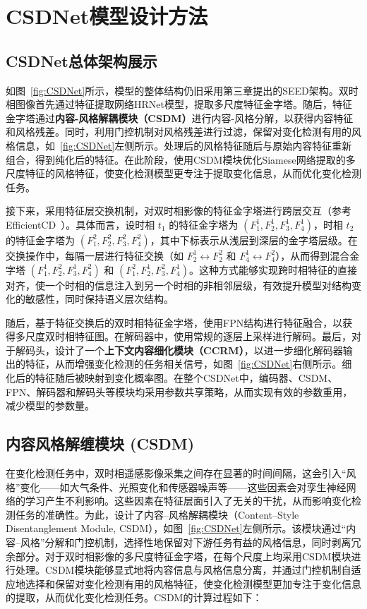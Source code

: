 \section{CSDNet模型设计方法}
\subsection{CSDNet总体架构展示}
如图~\ref{fig:CSDNet}所示，模型的整体结构仍旧采用第三章提出的SEED架构。双时相图像首先通过特征提取网络HRNet模型，提取多尺度特征金字塔。随后，特征金字塔通过\textbf{内容-风格解耦模块（CSDM）}进行内容-风格分解，以获得内容特征和风格残差。同时，利用门控机制对风格残差进行过滤，保留对变化检测有用的风格信息，如~\ref{fig:CSDNet}左侧所示。处理后的风格特征随后与原始内容特征重新组合，得到纯化后的特征。在此阶段，使用CSDM模块优化Siamese网络提取的多尺度特征的风格特征，使变化检测模型更专注于提取变化信息，从而优化变化检测任务。

接下来，采用特征层交换机制，对双时相影像的特征金字塔进行跨层交互（参考 EfficientCD~\cite{dong_efficientcd_2024}）。具体而言，设时相 $t_1$ 的特征金字塔为 $(F^1_1, F^1_2, F^1_3, F^1_4)$，时相 $t_2$ 的特征金字塔为 $(F^2_1, F^2_2, F^2_3, F^2_4)$，其中下标表示从浅层到深层的金字塔层级。在交换操作中，每隔一层进行特征交换（如 $F^1_2 \leftrightarrow F^2_2$ 和 $F^1_4 \leftrightarrow F^2_4$），从而得到混合金字塔 $(F^1_1, F^2_2, F^1_3, F^2_4)$ 和 $(F^2_1, F^1_2, F^2_3, F^1_4)$。这种方式能够实现跨时相特征的直接对齐，使一个时相的信息注入到另一个时相的非相邻层级，有效提升模型对结构变化的敏感性，同时保持语义层次结构。

随后，基于特征交换后的双时相特征金字塔，使用FPN结构进行特征融合，以获得多尺度双时相特征图。在解码器中，使用常规的逐层上采样进行解码。最后，对于解码头，设计了一个\textbf{上下文内容细化模块（CCRM）}，以进一步细化解码器输出的特征，从而增强变化检测的任务相关信号，如图~\ref{fig:CSDNet}右侧所示。细化后的特征随后被映射到变化概率图。在整个CSDNet中，编码器、CSDM、FPN、解码器和解码头等模块均采用参数共享策略，从而实现有效的参数重用，减少模型的参数量。


\subsection{内容风格解缠模块 (CSDM)}
在变化检测任务中，双时相遥感影像采集之间存在显著的时间间隔，这会引入“风格”变化——如大气条件、光照变化和传感器噪声等——这些因素会对孪生神经网络的学习产生不利影响。这些因素在特征层面引入了无关的干扰，从而影响变化检测任务的准确性。为此，设计了内容–风格解耦模块（Content–Style Disentanglement Module, CSDM），如图~\ref{fig:CSDNet}左侧所示。该模块通过“内容–风格”分解和门控机制，选择性地保留对下游任务有益的风格信息，同时剥离冗余部分。对于双时相影像的多尺度特征金字塔，在每个尺度上均采用CSDM模块进行处理。CSDM模块能够显式地将内容信息与风格信息分离，并通过门控机制自适应地选择和保留对变化检测有用的风格特征，使变化检测模型更加专注于变化信息的提取，从而优化变化检测任务。CSDM的计算过程如下：

